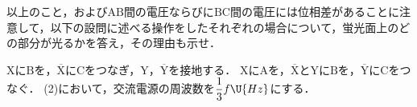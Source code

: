 \par
\hspace{1zw}以上のこと，および$\mathrm{AB}$間の電圧ならびに$\mathrm{BC}$間の電圧には位相差があることに注意して，以下の設問に述べる操作をしたそれぞれの場合について，蛍光面上のどの部分が光るかを答え，その理由も示せ．
\begin{komon}
 $\mathrm{X}$に$\mathrm{B}$を，$\overline{\mathrm{X}}$に$\mathrm{C}$をつなぎ，$\mathrm{Y}$，$\overline{\mathrm{Y}}$を接地する．
 $\mathrm{X}$に$\mathrm{A}$を，$\overline{\mathrm{X}}$と$\mathrm{Y}$に$\mathrm{B}$を，$\overline{\mathrm{Y}}$に$\mathrm{C}$をつなぐ．
 (2)において，交流電源の周波数を$\dfrac{1}{3}f\U{Hz}$にする．
\end{komon}

\newpage

\setlength{\columnseprule}{0.4pt}
